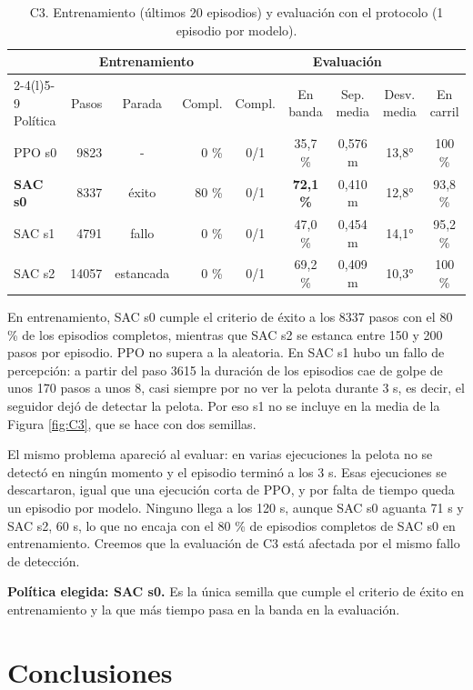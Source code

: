 \documentclass[11pt,a4paper]{article}
\begin{document}
\begin{table}[h]
\centering\small
\caption{C3. Entrenamiento (últimos 20 episodios) y evaluación con el protocolo (1 episodio por modelo).}
\label{tab:C3}
\setlength{\tabcolsep}{3.5pt}
\begin{tabular}{@{}lrcrccccc@{}}
\toprule
& \multicolumn{3}{c}{Entrenamiento} & \multicolumn{5}{c}{Evaluación} \\
\cmidrule(lr){2-4}\cmidrule(l){5-9}
Política & Pasos & Parada & Compl. & Compl. & En banda & Sep. media & Desv. media & En carril \\
\midrule
PPO s0 & 9823 & - & 0 \% & 0/1 & 35,7 \% & 0,576 m & 13,8° & 100 \% \\
\textbf{SAC s0} & 8337 & éxito & 80 \% & 0/1 & \textbf{72,1 \%} & 0,410 m & 12,8° & 93,8 \% \\
SAC s1 & 4791 & fallo & 0 \% & 0/1 & 47,0 \% & 0,454 m & 14,1° & 95,2 \% \\
SAC s2 & 14057 & estancada & 0 \% & 0/1 & 69,2 \% & 0,409 m & 10,3° & 100 \% \\
\bottomrule
\end{tabular}
\end{table}

En entrenamiento, SAC s0 cumple el criterio de éxito a los 8337 pasos con el 80 \% de los episodios completos,
mientras que SAC s2 se estanca entre 150 y 200 pasos por episodio. PPO no supera a la aleatoria. En SAC s1 hubo un
fallo de percepción: a partir del paso 3615 la duración de los episodios cae de golpe de unos 170 pasos a unos 8,
casi siempre por no ver la pelota durante 3 s, es decir, el seguidor dejó de detectar la pelota. Por eso s1 no
se incluye en la media de la Figura \ref{fig:C3}, que se hace con dos semillas.

El mismo problema apareció al evaluar: en varias ejecuciones la pelota no se detectó en ningún momento y el
episodio terminó a los 3 s. Esas ejecuciones se descartaron, igual que una ejecución corta de PPO, y por falta de
tiempo queda un episodio por modelo. Ninguno llega a los 120 s, aunque SAC s0 aguanta 71 s y SAC s2, 60 s, lo
que no encaja con el 80 \% de episodios completos de SAC s0 en entrenamiento. Creemos que la evaluación de C3 está
afectada por el mismo fallo de detección.

\textbf{Política elegida: SAC s0.} Es la única semilla que cumple el criterio de éxito en entrenamiento y la que
más tiempo pasa en la banda en la evaluación.

\section{Conclusiones}
\end{document}

